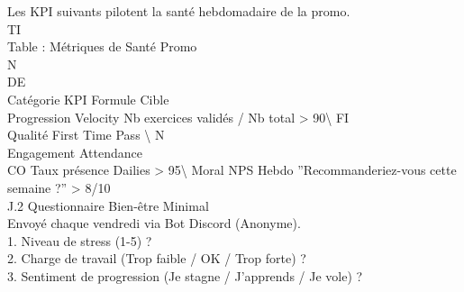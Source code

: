 \documentclass[12pt,landscape,a4paper]{article}
\begin{document}
Les KPI suivants pilotent la santé hebdomadaire de la promo.\\
\vspace{0.5em}
\vspace{0.5em}
\vspace{0.5em}
\vspace{0.5em}
TI\\
Table : Métriques de Santé Promo\\
\vspace{0.5em}
\vspace{0.5em}
\vspace{0.5em}
\vspace{0.5em}
N\\
DE\\
Catégorie   KPI             Formule                               Cible\\
Progression Velocity        Nb exercices validés / Nb total       \textgreater{} 90\textbackslash{}%
\vspace{0.5em}
\vspace{0.5em}
\vspace{0.5em}
\vspace{0.5em}
FI\\
Qualité     First Time Pass \textbackslash{}%
\vspace{0.5em}
\vspace{0.5em}
N\\
Engagement Attendance\\
CO        Taux présence Dailies                 \textgreater{} 95\textbackslash{}%
Moral       NPS Hebdo       ”Recommanderiez-vous cette semaine ?” \textgreater{} 8/10\\
\vspace{0.5em}
\vspace{0.5em}
\vspace{0.5em}
J.2 Questionnaire Bien-être Minimal\\
Envoyé chaque vendredi via Bot Discord (Anonyme).\\
\vspace{0.5em}
1. Niveau de stress (1-5) ?\\
\vspace{0.5em}
2. Charge de travail (Trop faible / OK / Trop forte) ?\\
\vspace{0.5em}
3. Sentiment de progression (Je stagne / J’apprends / Je vole) ?\\
\end{document}

